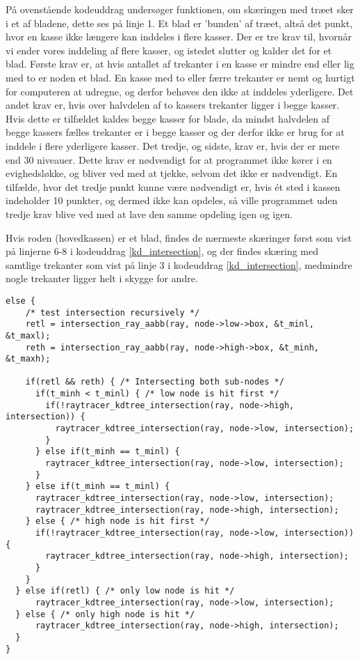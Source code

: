 På ovenstående kodeuddrag undersøger funktionen, om skæringen med træet sker i et af bladene, dette ses på linje 1. Et blad er 'bunden' af træet, altså det punkt, hvor en kasse ikke længere kan inddeles i flere kasser. Der er tre krav til, hvornår vi ender vores inddeling af flere kasser, og istedet slutter og kalder det for et blad. Første krav er, at hvis antallet af trekanter i en kasse er mindre end eller lig med to er noden et blad. En kasse med to eller færre trekanter er nemt og hurtigt for computeren at udregne, og derfor behøves den ikke at inddeles yderligere. Det andet krav er, hvis over halvdelen af to kassers trekanter ligger i begge kasser. Hvis dette er tilfældet kaldes begge kasser for blade, da mindst halvdelen af begge kassers fælles trekanter er i begge kasser og der derfor ikke er brug for at inddele i flere yderligere kasser. Det tredje, og sidste, krav er, hvis der er mere end 30 niveauer. Dette krav er nødvendigt for at programmet ikke kører i en evighedsløkke, og bliver ved med at tjekke, selvom det ikke er nødvendigt. En tilfælde, hvor det tredje punkt kunne være nødvendigt er, hvis ét sted i kassen indeholder 10 punkter, og dermed ikke kan opdeles, så ville programmet uden tredje krav blive ved med at lave den samme opdeling igen og igen.


Hvis roden (hovedkassen) er et blad, findes de nærmeste skæringer først som vist på linjerne 6-8 i kodeuddrag \ref{kd_intersection}, og der findes skæring med samtlige trekanter som vist på linje 3 i kodeuddrag \ref{kd_intersection}, medmindre nogle trekanter ligger helt i skygge for andre. 

\begin{lstlisting}[style=Cstyle, caption={Fortsættelse af uddraget fra funktionen raytracer\_kdtree\_intersection}]
else {
    /* test intersection recursively */
    retl = intersection_ray_aabb(ray, node->low->box, &t_minl, &t_maxl);
    reth = intersection_ray_aabb(ray, node->high->box, &t_minh, &t_maxh);

    if(retl && reth) { /* Intersecting both sub-nodes */
      if(t_minh < t_minl) { /* low node is hit first */
        if(!raytracer_kdtree_intersection(ray, node->high, intersection)) {
          raytracer_kdtree_intersection(ray, node->low, intersection);
        }
      } else if(t_minh == t_minl) {
        raytracer_kdtree_intersection(ray, node->low, intersection);
      }
    } else if(t_minh == t_minl) {
      raytracer_kdtree_intersection(ray, node->low, intersection);
      raytracer_kdtree_intersection(ray, node->high, intersection);
    } else { /* high node is hit first */
      if(!raytracer_kdtree_intersection(ray, node->low, intersection)) {
        raytracer_kdtree_intersection(ray, node->high, intersection);
      }
    }
  } else if(retl) { /* only low node is hit */
      raytracer_kdtree_intersection(ray, node->low, intersection);
  } else { /* only high node is hit */
      raytracer_kdtree_intersection(ray, node->high, intersection);
  }
}
\end{lstlisting}

